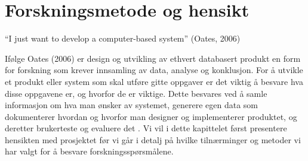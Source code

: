 \chapter{Forskningsmetode og hensikt}
\label{chp:forskningsmetode}

“I just want to develop a computer-based system” (Oates, 2006)

\noindent
Ifølge Oates (2006) er design og utvikling av ethvert databasert produkt en form for forskning som krever innsamling av data, analyse og konklusjon. For å utvikle et produkt eller system som skal utføre gitte oppgaver er det viktig å besvare hva disse oppgavene er, og hvorfor de er viktige. Dette besvares ved å samle informasjon om hva man ønsker av systemet, generere egen data som dokumenterer hvordan og hvorfor man designer og implementerer produktet, og deretter brukerteste og evaluere det \cite{Oates}. Vi vil i dette kapittelet først presentere hensikten med prosjektet før vi går i detalj på hvilke tilnærminger og metoder vi har valgt for å besvare forskningsspørsmålene.


